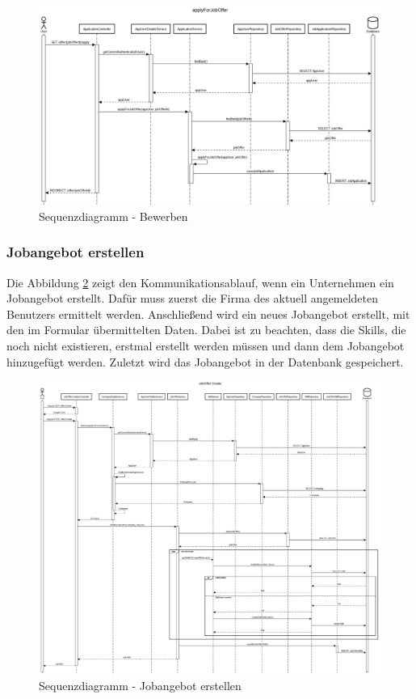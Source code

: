 \documentclass[12pt, letterpaper]{article}
\begin{document}
    \begin{figure}[h!]
        \includegraphics[width = \linewidth]{sequence/applyForJobOfferSequenzDiagramm.png}
        \caption{Sequenzdiagramm - Bewerben}
        \label{fig:Apply}
    \end{figure}

    \subsubsection{Jobangebot erstellen}

    Die Abbildung \ref{fig:CreateJobOffer} zeigt den Kommunikationsablauf, wenn ein Unternehmen ein Jobangebot erstellt. Dafür muss zuerst
    die Firma des aktuell angemeldeten Benutzers ermittelt werden. Anschließend wird ein neues Jobangebot erstellt, mit den im Formular
    übermittelten Daten. Dabei ist zu beachten, dass die Skills, die noch nicht existieren, erstmal erstellt werden müssen
    und dann dem Jobangebot hinzugefügt werden. Zuletzt wird das Jobangebot in der Datenbank gespeichert.

    \begin{figure}[h!]
        \includegraphics[width = \linewidth]{sequence/JobOfferCreateSequenzDiagramm.png}
        \caption{Sequenzdiagramm - Jobangebot erstellen}
        \label{fig:CreateJobOffer}
    \end{figure}
\end{document}
